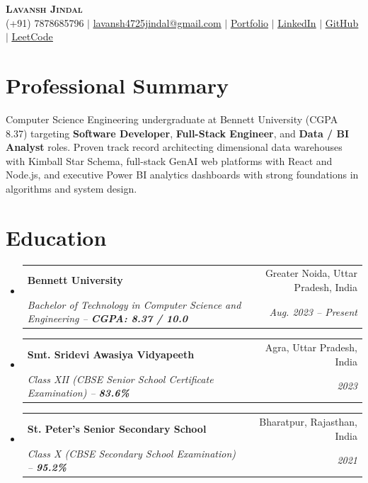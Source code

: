\documentclass[letterpaper,10pt]{article}
\makeatletter
\newcommand{\resumeSubheading}[4]{
  \vspace{-1.5pt}\item
    \begin{tabular*}{1.0\textwidth}[t]{l@{\extracolsep{\fill}}r}
      \textbf{#1} & #2 \\
      \textit{\small#3} & \textit{\small #4} \\
    \end{tabular*}\vspace{-4pt}
}
\newcommand{\resumeSubHeadingListStart}{\begin{itemize}[leftmargin=0.15in, label={}, itemsep=-1pt, topsep=1pt]}
\newcommand{\resumeSubHeadingListEnd}{\end{itemize}\vspace{-2pt}}
\makeatother
\begin{document}
\begin{center}
    \textbf{\Huge \scshape Lavansh Jindal} \\ \vspace{2.5pt}
    \small (+91) 7878685796 $|$
    \href{mailto:lavansh4725jindal@gmail.com}{\underline{lavansh4725jindal@gmail.com}} $|$
    \href{https://lavansh-jindal.vercel.app}{\underline{Portfolio}} $|$
    \href{https://www.linkedin.com/in/lavansh-jindal/}{\underline{LinkedIn}} $|$
    \href{https://github.com/lavansh4725}{\underline{GitHub}} $|$
    \href{https://leetcode.com/u/lavansh_0395/}{\underline{LeetCode}}
\end{center}
\vspace{-6pt}

\section{Professional Summary}
\begin{itemize}[leftmargin=0.15in, label={}, itemsep=0pt, topsep=1pt]
    \small{\item{Computer Science Engineering undergraduate at Bennett University (CGPA 8.37) targeting \textbf{Software Developer}, \textbf{Full-Stack Engineer}, and \textbf{Data / BI Analyst} roles. Proven track record architecting dimensional data warehouses with Kimball Star Schema, full-stack GenAI web platforms with React and Node.js, and executive Power BI analytics dashboards with strong foundations in algorithms and system design.}}
\end{itemize}
\vspace{-5pt}

\section{Education}
  \resumeSubHeadingListStart
    \resumeSubheading
      {Bennett University}{Greater Noida, Uttar Pradesh, India}
      {Bachelor of Technology in Computer Science and Engineering -- \textbf{CGPA: 8.37 / 10.0}}{Aug. 2023 -- Present}
    \resumeSubheading
      {Smt. Sridevi Awasiya Vidyapeeth}{Agra, Uttar Pradesh, India}
      {Class XII (CBSE Senior School Certificate Examination) -- \textbf{83.6\%}}{2023}
    \resumeSubheading
      {St. Peter's Senior Secondary School}{Bharatpur, Rajasthan, India}
      {Class X (CBSE Secondary School Examination) -- \textbf{95.2\%}}{2021}
  \resumeSubHeadingListEnd
\vspace{-4pt}
\end{document}
